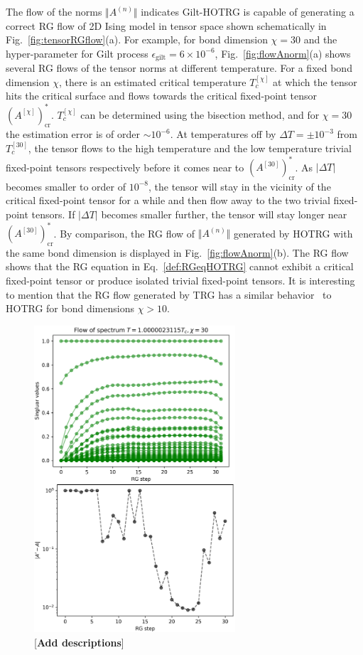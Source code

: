 \documentclass[aps,prb,reprint,superscriptaddress]{revtex4-2}
\begin{document}
The flow of the norms $\Vert A^{(n)} \Vert$ indicates Gilt-HOTRG is
capable of generating a correct RG flow of 2D Ising model in tensor
space shown schematically in Fig.~\ref{fig:tensorRGflow}(a). For example,
for bond dimension $\chi = 30$ and the hyper-parameter for Gilt process
$\epsilon_{\text{gilt}} = 6\times 10^{-6}$, Fig.~\ref{fig:flowAnorm}(a)
shows several RG flows of the tensor norms at different temperature. For
a fixed bond dimension $\chi$, there is an estimated critical
temperature $T_c^{[\chi]}$ at which the tensor
hits the critical surface and flows towards the critical fixed-point
tensor $(A^{[\chi]})^*_{\text{cr}}$. $T_c^{[\chi]}$ can be determined
using the bisection method, and for $\chi = 30$ the estimation error is
of order $\sim 10^{-6}$. At temperatures off by $\Delta T = \pm 10^{-3}$
from $T_c^{[30]}$, the tensor flows to the high temperature and the
low temperature trivial fixed-point tensors respectively before it comes
near to $(A^{[30]})^*_{\text{cr}}$. As $|\Delta T|$ becomes smaller to
order of $10^{-8}$, the tensor will stay in the vicinity of the critical
fixed-point tensor for a while and then flow away to the two trivial
fixed-point tensors. If $|\Delta T|$ becomes smaller further, the tensor
will stay longer near $(A^{[30]})^*_{\text{cr}}$. By comparison, the
RG flow of $\Vert A^{(n)}\Vert$ generated by HOTRG with the same bond
dimension is displayed in Fig.~\ref{fig:flowAnorm}(b). The RG flow shows
that the RG equation in Eq.~\eqref{def:RGeqHOTRG} cannot exhibit a
critical fixed-point tensor or produce isolated trivial fixed-point
tensors. It is interesting to mention that the RG flow generated by TRG
has a similar behavior~\cite{Berker2008} to HOTRG for bond dimensions
$\chi > 10$.
\begin{figure}[htb]
    \includegraphics[width=7.5cm]{./figs/flowA}
    \caption{\label{fig:flowA}[\textbf{Add descriptions}]}
\end{figure}
%
\end{document}
